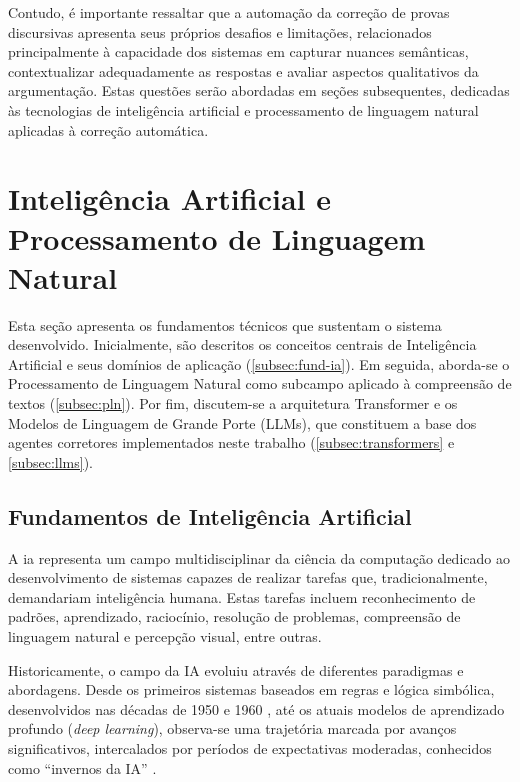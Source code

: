 Contudo, é importante ressaltar que a automação da correção de provas discursivas apresenta seus próprios desafios e limitações, relacionados principalmente à capacidade dos sistemas em capturar nuances semânticas, contextualizar adequadamente as respostas e avaliar aspectos qualitativos da argumentação. Estas questões serão abordadas em seções subsequentes, dedicadas às tecnologias de inteligência artificial e processamento de linguagem natural aplicadas à correção automática.

\section{Inteligência Artificial e Processamento de Linguagem Natural}
\label{sec:ia-pln}

Esta seção apresenta os fundamentos técnicos que sustentam o sistema desenvolvido. Inicialmente, são descritos os conceitos centrais de Inteligência Artificial e seus domínios de aplicação (\autoref{subsec:fund-ia}). Em seguida, aborda-se o Processamento de Linguagem Natural como subcampo aplicado à compreensão de textos (\autoref{subsec:pln}). Por fim, discutem-se a arquitetura Transformer e os Modelos de Linguagem de Grande Porte (LLMs), que constituem a base dos agentes corretores implementados neste trabalho (\autoref{subsec:transformers} e \autoref{subsec:llms}).

\subsection{Fundamentos de Inteligência Artificial}
\label{subsec:fund-ia}

A \gls{ia} representa um campo multidisciplinar da ciência da computação dedicado ao desenvolvimento de sistemas capazes de realizar tarefas que, tradicionalmente, demandariam inteligência humana. Estas tarefas incluem reconhecimento de padrões, aprendizado, raciocínio, resolução de problemas, compreensão de linguagem natural e percepção visual, entre outras.

Historicamente, o campo da IA evoluiu através de diferentes paradigmas e abordagens. Desde os primeiros sistemas baseados em regras e lógica simbólica, desenvolvidos nas décadas de 1950 e 1960 \cite{russell_artificial_2021}, até os atuais modelos de aprendizado profundo (\textit{deep learning}), observa-se uma trajetória marcada por avanços significativos, intercalados por períodos de expectativas moderadas, conhecidos como ``invernos da IA'' \cite{torfi_natural_2021}.

